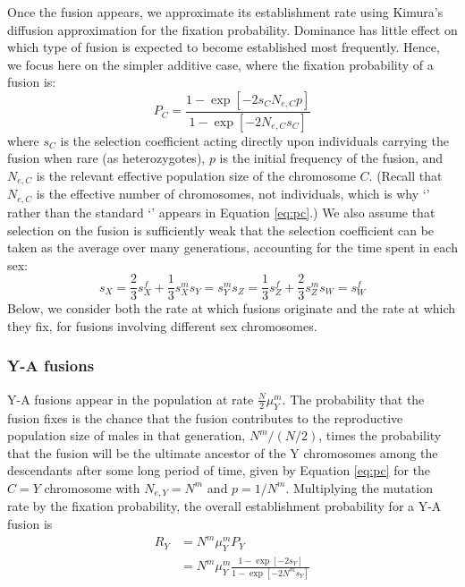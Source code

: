 Once the fusion appears, we approximate its establishment rate using Kimura's \citeyearpar{Kimura1962} diffusion approximation for the fixation probability. Dominance has little effect on which type of fusion is expected to become established most frequently. Hence, we focus here on the simpler additive case, where the fixation probability of a fusion is:
\begin{equation}\label{eq:pc}
P_C = \frac{\text{1} - \exp[-\text{2}s_C N_{e,C}p]}{\text{1} - \exp[-\text{2}N_{e,C}s_C ]}
\end{equation}
where $s_C$ is the selection coefficient acting directly upon individuals carrying the fusion when rare (as heterozygotes), $p$ is the initial frequency of the fusion, and $N_{e,C}$ is the relevant effective population size of the chromosome $C$. (Recall that $N_{e,C}$ is the effective number of chromosomes, not individuals, which is why `' rather than the standard `' appears in Equation \ref{eq:pc}.) We also assume that selection on the fusion is sufficiently weak that the selection coefficient can be taken as the average over many generations, accounting for the time spent in each sex:
\begin{subequations}
\begin{equation}
s_X = \frac{\text{2}}{\text{3}}s^f_X + \frac{\text{1}}{\text{3}}s^m_X
\end{equation}
\begin{equation}
s_Y = s^m_Y
\end{equation}
\begin{equation}
s_Z = \frac{\text{1}}{\text{3}}s^f_Z + \frac{\text{2}}{\text{3}}s^m_Z
\end{equation}
\begin{equation}
s_W = s^f_W
\end{equation}
\end{subequations}
Below, we consider both the rate at which fusions originate and the rate at which they fix, for fusions involving different sex chromosomes.

\subsubsection{Y-A fusions}

Y-A fusions appear in the population at rate $\frac{N}{\text{2}}\mu^m_Y$. The probability that the fusion fixes is the chance that the fusion contributes to the reproductive population size of males in that generation, $N^m / (N/\text{2})$, times the probability that the fusion will be the ultimate ancestor of the Y chromosomes among the descendants after some long period of time, given by Equation \ref{eq:pc} for the $C = Y$ chromosome with $N_{e,Y}=N^m$ and $p=\text{1}/N^m$. Multiplying the mutation rate by the fixation probability, the overall establishment probability for a Y-A fusion is
\begin{align}\label{eq:Ry}
R_Y &= N^m \mu^m_Y  P_Y \nonumber \\
&= N^m \mu^m_Y \frac{\text{1}-\exp[-\text{2}s_Y]}{\text{1}-\exp[-\text{2}N^ms_Y]}
\end{align}

